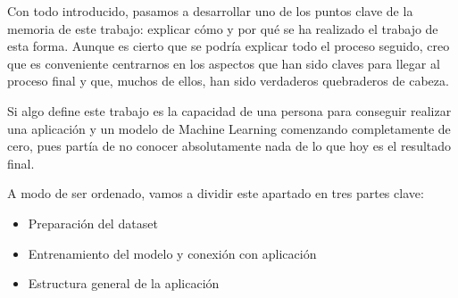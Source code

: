 

	Con todo introducido, pasamos a desarrollar uno de los puntos clave de la memoria de este trabajo: explicar cómo y por qué se ha realizado el trabajo de esta forma. Aunque es cierto que se podría explicar todo el proceso seguido, creo que es conveniente centrarnos en los aspectos que han sido claves para llegar al proceso final y que, muchos de ellos, han sido verdaderos quebraderos de cabeza.
	
	Si algo define este trabajo es la capacidad de una persona para conseguir realizar una aplicación y un modelo de Machine Learning comenzando completamente de cero, pues partía de no conocer absolutamente nada de lo que hoy es el resultado final. 
	
	A modo de ser ordenado, vamos a dividir este apartado en tres partes clave:
	\begin{itemize}
		\item Preparación del dataset
		\item Entrenamiento del modelo y conexión con aplicación
		\item Estructura general de la aplicación
	\end{itemize}
	
